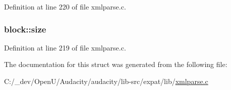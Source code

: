 Definition at line 220 of file xmlparse.\+c.

\subsubsection[{\texorpdfstring{size}{size}}]{ block\+::size}\hypertarget{structblock_a0ffa8f1f3773c38a4b91cdf179448af2}{}\label{structblock_a0ffa8f1f3773c38a4b91cdf179448af2}


Definition at line 219 of file xmlparse.\+c.



The documentation for this struct was generated from the following file\+:\begin{DoxyCompactItemize}
\item 
C\+:/\+\_\+dev/\+Open\+U/\+Audacity/audacity/lib-\/src/expat/lib/\hyperlink{xmlparse_8c}{xmlparse.\+c}\end{DoxyCompactItemize}
